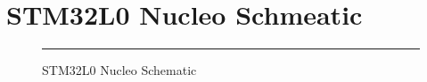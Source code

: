 
\chapter{STM32L0 Nucleo Schmeatic}

\label{stm32}


\begin{figure}[htbp]
  \centering
  \rule{35em}{0.5pt}
  \caption[STM32L0 Nucleo Schmeatic]{STM32L0 Nucleo Schematic}
  \label{fig:RxCircuit}
\end{figure}
